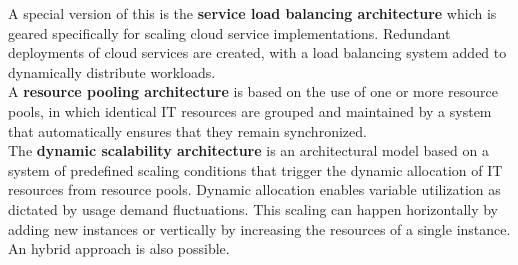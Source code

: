A special version of this is the \textbf{service load balancing architecture} which is geared specifically for scaling cloud service implementations.
Redundant deployments of cloud services are created, with a load balancing system added to dynamically distribute workloads.\\

A \textbf{resource pooling architecture} is based on the use of one or more resource pools, in which identical IT resources are grouped and maintained by a system that automatically ensures that they remain synchronized.\\

The \textbf{dynamic scalability architecture} is an architectural model based on a system of predefined scaling conditions that trigger the dynamic allocation of IT resources from resource pools.
Dynamic allocation enables variable utilization as dictated by usage demand fluctuations.
This scaling can happen horizontally by adding new instances or vertically by increasing the resources of a single instance.
An hybrid approach is also possible.\\




